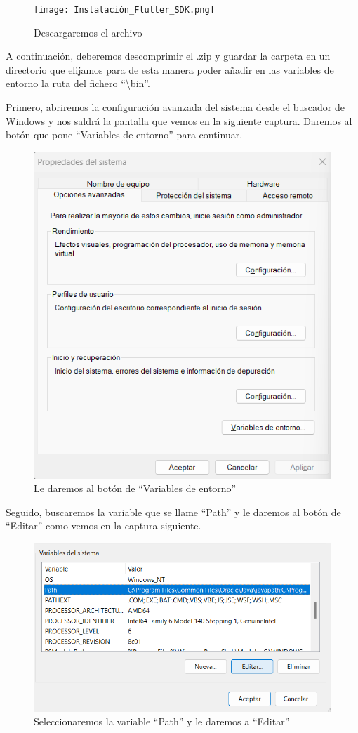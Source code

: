 \begin{figure}[H]
    \centering
    \texttt{[image: Instalación\_Flutter\_SDK.png]}
    \caption{Descargaremos el archivo}
    \label{C7}
\end{figure}

A continuación, deberemos descomprimir el .zip y guardar la carpeta en un directorio que elijamos para de esta manera poder añadir en las variables de entorno la ruta del fichero ``\textbackslash bin''.

Primero, abriremos la configuración avanzada del sistema desde el buscador de Windows y nos saldrá la pantalla que vemos en la siguiente captura. Daremos al botón que pone ``Variables de entorno'' para continuar.

\begin{figure}[H]
    \centering
    \includegraphics[width=0.8\linewidth]{Variables_Entorno_1.png}
    \caption{Le daremos al botón de ``Variables de entorno''}
    \label{C8}
\end{figure}

Seguido, buscaremos la variable que se llame ``Path'' y le daremos al botón de ``Editar'' como vemos en la captura siguiente.

\begin{figure}[H]
    \centering
    \includegraphics[width=0.8\linewidth]{Variables_Entorno_2.png}
    \caption{Seleccionaremos la variable ``Path'' y le daremos a ``Editar''}
    \label{C9}
\end{figure}

